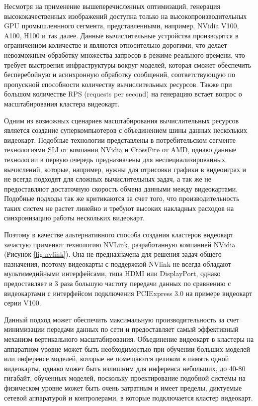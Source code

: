 Несмотря на применение вышеперечисленных оптимизаций,
генерация высококачественных изображений доступна только на высокопроизводительных GPU промышленнного сегмента,
представленными, например, NVidia V100, A100, H100 и так далее. 
Данные вычислительные устройства производятся в ограниченном количестве и являются относительно дорогими,
что делает невозможным обработку множества запросов в режиме реального времени, что требует выстроения инфраструктуры
вокруг моделей, которая сможет обеспечить бесперебойную и асинхронную обработку сообщений, 
соответствующую по пропускной способности количеству вычислительных ресурсов.
Также при большом количестве RPS (requests per second) на генерацию встает вопрос о масштабирования кластера
видеокарт. 

Одним из возможных сценариев масштабирования вычислительных ресурсов является создание суперкомпьютеров с объединением
шины данных нескольких видеокарт. Подобные технологии представлены в потребительском сегменте технологиями SLI от компании NVidia и CrossFire от AMD, однако
данные технологии в первую очередь предназначены для неспециализированных вычислений, которые, например, нужны для
отрисовки графики в видеоиграх и не всегда подходят для сложных вычислительных задач, а так же не предоставляют достаточную скорость
обмена данными между видеокартами. Подобные подходы так же критикаются за счет того, что производительность таких систем не растет линейно и
требуют высоких накладных расходов на синхронизацию работы нескольких видеокарт.

Поэтому в качестве альтернативного способа создания кластеров видеокарт зачастую применют технологию NVLink, разработанную 
компанией NVidia (Рисунок \ref{fig:nvlink}). Она не предназначена для решения задач общего назначения, поэтому видеокарты с поддержкой NVlink не всегда обладают 
мультимедийными интерфейсами, типа HDMI или DisplayPort, однако предоставляет в 3 раза большую частоту передачи данных
по сравнению с видеокартами с интерфейсом подключения PCIExpress 3.0 на примере видеокарт серии V100.

Данный подход может обеспечить максимальную производительность за счет минимизации передачи данных по сети
и предоставляет самый эффективный механизм вертикального масштабирования. Объединение видеокарт в кластеры на аппаратном
уровне может быть необходимостью при обучении больших моделей или инференсе моделей, которые не помещаются целиком
в память одной видеокарты, однако может быть излишним для инференса небольших, до 40-80 гигабайт, обученных моделей,
поскольку проектирование подобной системы на физическом уровне может быть очень затратным и имеет пределы, диктуемые
сетевой аппаратурой и контролерами, в которые подключается кластер видеокарт.

